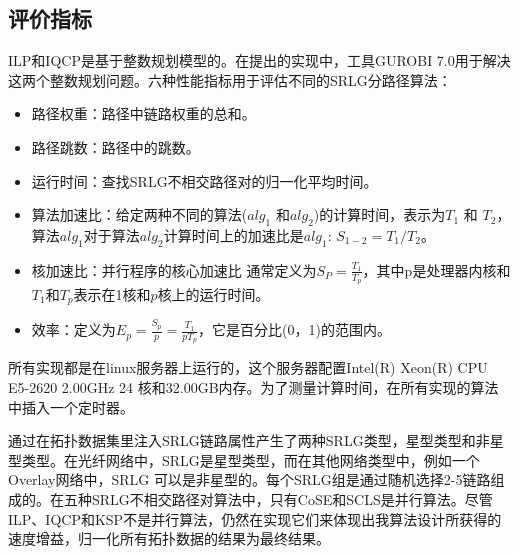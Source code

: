 \subsection{评价指标}
ILP和IQCP是基于整数规划模型的。在提出的实现中，工具GUROBI 7.0\cite{optimization2012gurobi}用于解决这两个整数规划问题。六种性能指标用于评估不同的SRLG分路径算法：
\begin{itemize}
  \item 路径权重：路径中链路权重的总和。
  \item 路径跳数：路径中的跳数。
  \item 运行时间：查找SRLG不相交路径对的归一化平均时间。
  \item 算法加速比：给定两种不同的算法($alg_1$ 和$alg_2$)的计算时间，表示为$T_1$ 和 $T_2$，算法$alg_1$对于算法$alg_2$计算时间上的加速比是$alg_1$: ${S_{1 - 2}} = T_1/T_2$。
  \item 核加速比：并行程序的核心加速比\cite{grama2003introduction} 通常定义为$S_P=\frac{T_1}{T_p}$，其中p是处理器内核和$T_1$和$T_p$表示在1核和$p$核上的运行时间。
  \item 效率\cite{grama2003introduction}：定义为$E_p=\frac{S_p}{p}=\frac{T_1}{pT_p}$，它是百分比(0，1)的范围内。


\end{itemize}


所有实现都是在linux服务器上运行的，这个服务器配置Intel(R) Xeon(R) CPU E5-2620  2.00GHz 24 核和32.00GB内存。为了测量计算时间，在所有实现的算法中插入一个定时器。

通过在拓扑数据集里注入SRLG链路属性产生了两种SRLG类型，星型类型和非星型类型。在光纤网络中，SRLG是星型类型，而在其他网络类型中，例如一个Overlay网络中，SRLG 可以是非星型的。每个SRLG组是通过随机选择2-5链路组成的。在五种SRLG不相交路径对算法中，只有CoSE和SCLS是并行算法。尽管ILP、IQCP和KSP不是并行算法，仍然在实现它们来体现出我算法设计所获得的速度增益，归一化\cite{tax2000feature}所有拓扑数据的结果为最终结果。


